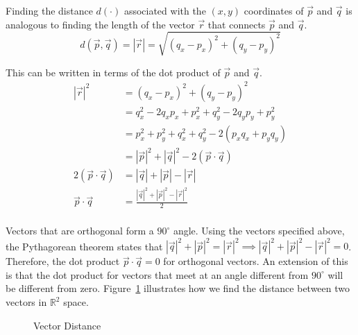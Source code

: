 \documentclass[12pt]{article}
\begin{document}
 Finding the distance $d(\cdot)$ associated with the $(x,y)$ coordinates of $\vec{p}$ and $\vec{q}$ is analogous to finding the length of the vector $\vec{r}$ that connects $\vec{p}$ and $\vec{q}$.
\[
d(\vec{p},\vec{q}) = |\vec{r}| = \sqrt{(q_x-p_x)^2+(q_y-p_y)^2}
\]

 This can be written in terms of the dot product of $\vec{p}$ and $\vec{q}$.
\begin{align*}
|\vec{r}|^2 &= (q_x-p_x)^2+(q_y-p_y)^2 \\
&= q_x^2-2q_xp_x+p_x^2+q_y^2-2q_yp_y+p_y^2 \\
&= p_x^2 + p_y^2 + q_x^2+q_y^2 - 2(p_xq_x + p_yq_y) \\
&= |\vec{p}|^2 + |\vec{q}|^2 - 2(\vec{p}\cdot\vec{q}) \\
2(\vec{p}\cdot\vec{q})  &= |\vec{q}| + |\vec{p}| - |\vec{r}| \\
\vec{p}\cdot\vec{q}  &= \frac{|\vec{q}|^2 + |\vec{p}|^2 - |\vec{r}|^2}{2} \\
\end{align*}

 Vectors that are orthogonal form a $90^\circ$ angle. Using the vectors specified above, the Pythagorean theorem states that $ |\vec{q}|^2 + |\vec{p}|^2 = |\vec{r}|^2\implies  |\vec{q}|^2 + |\vec{p}|^2 - |\vec{r}|^2= 0$. Therefore, the dot product $\vec{p}\cdot\vec{q}=0$ for orthogonal vectors. An extension of this is that the dot product for vectors that meet at an angle different from $90^\circ$ will be different from zero. Figure~\ref{fig:vectordistance} illustrates how we find the distance between two vectors in $\mathbb{R}^2$ space. \\

\begin{figure}[h!]
\centering
\caption{Vector Distance}
\label{fig:vectordistance}
\end{figure}
\end{document}
